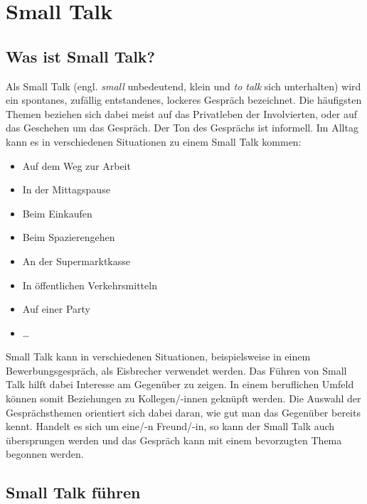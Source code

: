\chapter{Small Talk}
\label{ch:smalltalk}

\section{Was ist Small Talk?}
\label{sec:smalltalk_was}

Als Small Talk (engl. \textit{small} \glqq{}unbedeutend, klein\grqq{} und \textit{to talk} \glqq{}sich unterhalten\grqq{}) wird ein spontanes, zufällig entstandenes, lockeres Gespräch
bezeichnet. Die häufigsten Themen beziehen sich dabei meist auf das Privatleben der Involvierten, oder auf das Geschehen um das Gespräch. Der Ton des Gesprächs ist informell.\cite{misc:wikipedia_smalltalk} \newline
Im Alltag kann es in verschiedenen Situationen zu einem Small Talk kommen:
\begin{itemize}
    \item Auf dem Weg zur Arbeit
    \item In der Mittagspause
    \item Beim Einkaufen
    \item Beim Spazierengehen
    \item An der Supermarktkasse
    \item In öffentlichen Verkehrsmitteln
    \item Auf einer Party
    \item \dots
\end{itemize}

Small Talk kann in verschiedenen Situationen, beispielsweise in einem Bewerbungsgespräch, als \glqq{}Eisbrecher\grqq{} verwendet werden. Das Führen von Small Talk hilft dabei Interesse am
Gegenüber zu zeigen. In einem beruflichen Umfeld können somit Beziehungen zu Kollegen/-innen geknüpft werden. \newline
Die Auswahl der Gesprächsthemen orientiert sich dabei daran, wie gut man das Gegenüber bereits kennt. Handelt es sich um eine/-n Freund/-in, so kann der Small Talk auch übersprungen werden
und das Gespräch kann mit einem bevorzugten Thema begonnen werden. \cite{misc:wikipedia_smalltalk}

\section{Small Talk führen}
\label{sec:smalltalk_führen}

